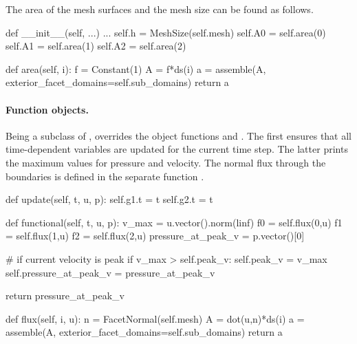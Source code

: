 The area of the mesh surfaces and the mesh size can be found as follows.
\begin{python}
def __init__(self, ...)
    ...
    self.h = MeshSize(self.mesh)
    self.A0 = self.area(0)
    self.A1 = self.area(1)
    self.A2 = self.area(2)

def area(self, i):
    f = Constant(1)
    A = f*ds(i)
    a = assemble(A, exterior_facet_domains=self.sub_domains)
    return a
\end{python}

\paragraph{Function objects.}
Being a subclass of ,  overrides the object
functions  and . The first ensures that all
time-dependent variables are updated for the current time step. The latter
prints the maximum values for pressure and velocity. The normal flux
through the boundaries is defined in the separate function .
\begin{python}
def update(self, t, u, p):
    self.g1.t = t
    self.g2.t = t

def functional(self, t, u, p):
    v_max = u.vector().norm(linf)
    f0 = self.flux(0,u)
    f1 = self.flux(1,u)
    f2 = self.flux(2,u)
    pressure_at_peak_v = p.vector()[0]

    # if current velocity is peak
    if v_max > self.peak_v:
        self.peak_v = v_max
        self.pressure_at_peak_v = pressure_at_peak_v

    return pressure_at_peak_v

def flux(self, i, u):
    n = FacetNormal(self.mesh)
    A = dot(u,n)*ds(i)
    a = assemble(A, exterior_facet_domains=self.sub_domains)
    return a
\end{python}

